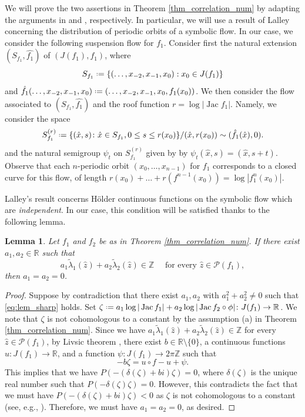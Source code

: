 \documentclass[11pt]{amsart}
\theoremstyle{plain}
\newtheorem{lem}[thm]{Lemma}
\theoremstyle{definition}
\theoremstyle{remark}
\newcommand*{\defeq}{\mathrel{\vcenter{\baselineskip0.5ex \lineskiplimit0pt
			\hbox{\scriptsize.}\hbox{\scriptsize.}}}%
	=}
\DeclareMathOperator{\Jac}{Jac}
\begin{document}
We will prove the two assertions in Theorem 
\ref{thm_correlation_num} by adapting
the arguments
in \cite[Section 3]{SchwartzSharp93} and 
\cite[Section 3]{Sharp98}, respectively.
In particular, we will use a result of Lalley \cite{Lalley87} concerning the distribution of periodic orbits of a symbolic flow. In our case, we consider the following suspension flow for $f_1$. 
Consider first the natural extension
$(S_{f_1},\hat{f_1})$ of $(J(f_1), f_1)$,
where 
$$S_{f_1} \defeq \{(\ldots, x_{-2}, x_{-1},x_0):x_0 \in J(f_1)\}$$ and
$\hat{f_1}(\ldots, x_{-2}, x_{-1},x_0) \defeq
(\ldots, x_{-2}, x_{-1},x_0, f_1(x_0))$.
We then consider the flow associated to $(S_{f_1},\hat{f_1})$ and the 
roof function $r = \log |\Jac f_1|$. Namely, we consider the space
\[
S_{f_1}^{(r)} \defeq \{
(\hat{x}, s)\colon
\hat{x} \in S_{f_1}, 0\leq s\leq r(x_0) \}/(\hat x, r(x_0))\sim (\hat f_1(\hat x), 0).
\]
and the natural semigroup $\psi_t$ 
on
$S_{f_1}^{(r)}$ given by
by $\psi_t (\hat x, s)= (\hat x, s+t)$. Observe that each $n$-periodic orbit $(x_0, \dots, x_{n-1})$
for $f_1$ corresponds to a closed curve for this flow, of length
$r(x_0)+ \dots + r(f^{n-1}(x_0)) = \log |f_1^n (x_0)|$.

Lalley's result concerns H\"older continuous functions on the symbolic flow which are {\it independent}. In our case, this condition
will be satisfied 
thanks to the following lemma.

\medskip

\begin{lem} \label{lem_sharp}
Let $f_1$ and $f_2$ be as in Theorem \ref{thm_correlation_num}.
If there exist $a_1,a_2 \in \mathbb{R}$ such that 
\begin{equation}\label{eq:lem_sharp}
a_1\widetilde{\lambda}_1(\hat{z})+a_2\widetilde{\lambda}_2(\hat{z}) \in \mathbb{Z}
\quad \mbox{ for every }
\hat{z} \in \mathcal{P}(f_1),
\end{equation}
then $a_1=a_2=0$.
\end{lem} 
\begin{proof}
Suppose by contradiction that 
there exist $a_1, a_2$ with $a_1^2+a_2^2 \neq 0$ such that \eqref{eq:lem_sharp} holds.
Set $\zeta \defeq a_1\log |\Jac f_1| +a_2\log |\Jac f_2 \circ \phi| \colon J(f_1) \to \mathbb{R}$. 
We note that $\zeta$ is not cohomologous to a constant by the
assumption (a) in Theorem \ref{thm_correlation_num}. Since 
we have
$a_1\widetilde{\lambda}_1(\hat{z})+a_2\widetilde{\lambda}_2(\hat{z}) \in \mathbb{Z}$ for every $\hat{z} \in \mathcal{P}(f_1)$, by Livsic theorem
\cite{Livsic71},
there exist $b \in \mathbb{R} \setminus \{0\}$, a
continuous functions $u \colon J(f_1) \to \mathbb{R}$, and a function
$\psi \colon J(f_1) \to 2\pi \mathbb{Z}$ such that
$$-b\zeta = u \circ f - u + \psi.$$
This implies that we have
$P(-(\delta(\zeta) + bi)\zeta)=0$,
where $\delta(\zeta)$ is the unique
real number such that $P(-\delta(\zeta) \zeta)=0$. However, this contradicts the fact that 
we must have $P(-(\delta(\zeta) + bi)\zeta)<0$ 
as
$\zeta$ is not cohomologous to a constant
(see, e.g., \cite[Lemma 5.14]{BD24eq2}). Therefore, we must have $a_1 = a_2 = 0$, as desired.
\end{proof}
\end{document}
